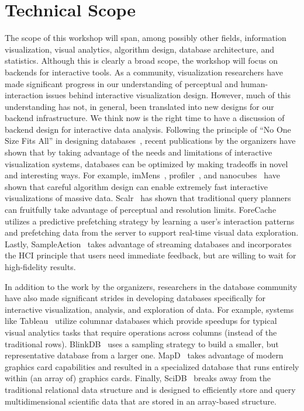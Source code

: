 \documentclass[journal]{vgtc}                %
\begin{document}
\section{Technical Scope}
The scope of this workshop will span, among possibly other fields, information visualization, visual analytics, algorithm design, database architecture, and statistics. 
Although this is clearly a broad scope, the workshop will focus on backends for interactive tools. 
As a community, visualization researchers have made significant progress in our understanding of perceptual and human-interaction issues behind interactive visualization design. 
However, much of this understanding has not, in general, been translated into new designs for our backend infrastructure. 
We think now is the right time to have a discussion of backend design for interactive data analysis. 
Following the principle of ``No One Size Fits All'' in designing databases~\cite{stonebraker2005one}, recent publications by the organizers have shown that by taking advantage of the needs and limitations of interactive visualization systems, databases can be optimized by making tradeoffs in novel and interesting
ways. 
For example, imMens~\cite{Liu:2013:IRT}, profiler~\cite{Kandel:2012:PIS}, and nanocubes~\cite{Lins:2013:NFR} have shown that careful algorithm design can enable extremely fast interactive visualizations of massive data. 
Scalr~\cite{Battle:2013:DRO} has shown that traditional query planners can fruitfully take advantage of perceptual and resolution limits. 
ForeCache~\cite{battle2016dynamic} utilizes a predictive prefetching strategy by learning a user's interaction patterns~\cite{brown2014finding} and prefetching data from the server to support real-time visual data exploration. 
Lastly, SampleAction~\cite{Fisher:2012:TMI} takes advantage of streaming databases and
incorporates the HCI principle that users need immediate feedback, but are willing to wait for high-fidelity results.

In addition to the work by the organizers, researchers in the database community have also made significant strides in developing databases specifically for interactive visualization, analysis, and exploration
of data. 
For example, systems like Tableau~\cite{stolte2002polaris} utilize columnar databases which provide speedups for typical visual analytics tasks that require operations across columns (instead of the traditional rows). 
BlinkDB~\cite{Agarwal:2013:BQW} uses a sampling strategy to build a smaller, but representative database from a larger one. 
MapD~\cite{mapd} takes advantage of modern graphics card capabilities and resulted in a specialized database that runs entirely within (an array of) graphics cards. 
Finally, SciDB~\cite{cudre2009demonstration} breaks away from the traditional relational data structure and is designed to efficiently store and query multidimensional scientific data that are stored in an array-based structure. 
\end{document}
